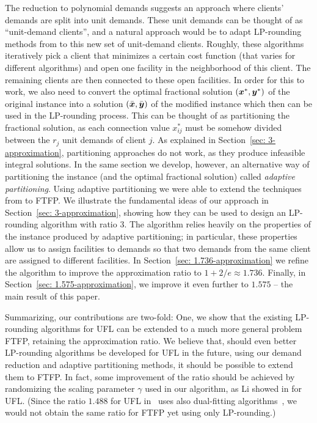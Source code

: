 \documentclass[11pt]{article}
\begin{document}
The reduction to polynomial demands suggests an approach
where clients' demands are split into unit demands. These
unit demands can be thought of as ``unit-demand clients'',
and a natural approach would be to adapt LP-rounding methods
from \cite{gupta08,ChudakS04,ByrkaGS10} to this new set of
unit-demand clients.  Roughly, these algorithms iteratively
pick a client that minimizes a certain cost function (that
varies for different algorithms) and open one facility in
the neighborhood of this client. The remaining clients are
then connected to these open facilities.  In order for this
to work, we also need to convert the optimal fractional
solution $(\boldsymbol{x}^\ast,\boldsymbol{y}^\ast)$ of the original instance
into a solution $(\bar{\boldsymbol{x}},\bar{\boldsymbol{y}})$ of the modified instance
which then can be used in the LP-rounding process. This can
be thought of as partitioning the fractional solution, as
each connection value $x^\ast_{ij}$ must be somehow divided
between the $r_j$ unit demands of client $j$.  As explained
in Section~\ref{sec: 3-approximation}, {\naive}
partitioning approaches do not work, as they produce
infeasible integral solutions.  In the same section we
develop, however, an alternative way of partitioning the
instance (and the optimal fractional solution) called
\emph{adaptive partitioning}. Using adaptive partitioning we
were able to extend the techniques from
\cite{gupta08,ChudakS04,ByrkaGS10} to FTFP.  We illustrate
the fundamental ideas of our approach in Section~\ref{sec:
  3-approximation}, showing how they can be used to design
an LP-rounding algorithm with ratio $3$. The algorithm
relies heavily on the properties of the instance produced by
adaptive partitioning; in particular, these properties allow
us to assign facilities to demands so that two demands from
the same client are assigned to different facilities.  In
Section~\ref{sec: 1.736-approximation} we refine the
algorithm to improve the approximation ratio to
$1+2/e\approx 1.736$.  Finally, in Section~\ref{sec:
  1.575-approximation}, we improve it even further to
$1.575$ -- the main result of this paper.

Summarizing, our contributions are two-fold: One, we show
that the existing LP-rounding algorithms for UFL can be
extended to a much more general problem FTFP, retaining the
approximation ratio. We believe that, should even better
LP-rounding algorithms be developed for UFL in the future,
using our demand reduction and adaptive partitioning
methods, it should be possible to extend them to FTFP.
In fact, some improvement of the ratio
should be achieved by randomizing the scaling parameter
$\gamma$ used in our algorithm, as Li showed in \cite{Li11}
for UFL.  (Since the ratio $1.488$ for UFL in~\cite{Li11}
uses also dual-fitting
algorithms~\cite{MahdianYZ06}, we would not obtain the same
ratio for FTFP yet using only LP-rounding.)
\end{document}
